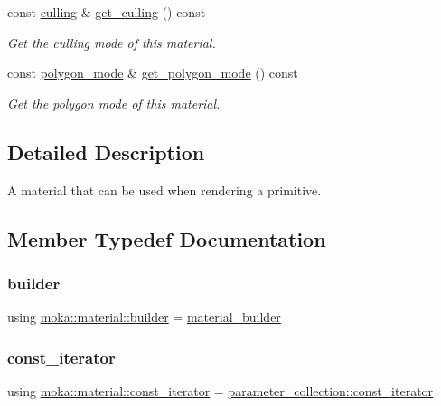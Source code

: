 \begin{DoxyCompactItemize}
const \mbox{\hyperlink{structmoka_1_1culling}{culling}} \& \mbox{\hyperlink{classmoka_1_1material_a3eaec73eaa7aa63c4abaeb82dfb9d0c7}{get\+\_\+culling}} () const
\begin{DoxyCompactList}\small\item\em Get the culling mode of this material. \end{DoxyCompactList}\item 
const \mbox{\hyperlink{structmoka_1_1polygon__mode}{polygon\+\_\+mode}} \& \mbox{\hyperlink{classmoka_1_1material_aff4223e795cb85a9728be4ee9e994fe4}{get\+\_\+polygon\+\_\+mode}} () const
\begin{DoxyCompactList}\small\item\em Get the polygon mode of this material. \end{DoxyCompactList}\end{DoxyCompactItemize}


\subsection{Detailed Description}
A material that can be used when rendering a primitive. 

\subsection{Member Typedef Documentation}
\mbox{\label{classmoka_1_1material_a7dd1fd24e083df29846cf501ea85a1cb}} 
\subsubsection{\texorpdfstring{builder}{builder}}
{\footnotesize\ttfamily using \mbox{\hyperlink{classmoka_1_1material_a7dd1fd24e083df29846cf501ea85a1cb}{moka\+::material\+::builder}} =  \mbox{\hyperlink{classmoka_1_1material__builder}{material\+\_\+builder}}}

\mbox{\label{classmoka_1_1material_ab87ba893c5a7741e95718b0bddbc1049}} 
\subsubsection{\texorpdfstring{const\_iterator}{const\_iterator}}
{\footnotesize\ttfamily using \mbox{\hyperlink{classmoka_1_1material_ab87ba893c5a7741e95718b0bddbc1049}{moka\+::material\+::const\+\_\+iterator}} =  \mbox{\hyperlink{classmoka_1_1parameter__collection_a6d2ad87d4e43742300cb9ded3beee731}{parameter\+\_\+collection\+::const\+\_\+iterator}}}

